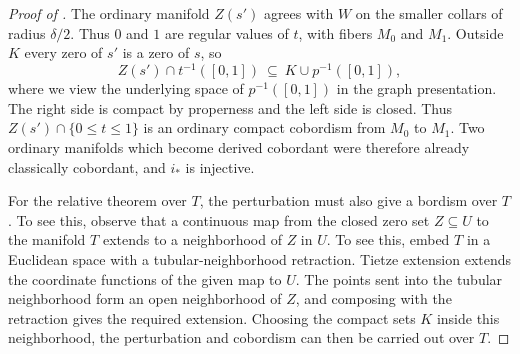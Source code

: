 \begin{proof}[Proof of ]
  The ordinary manifold $Z(s')$ agrees with $W$ on the smaller collars of
  radius $\delta/2$. Thus $0$ and $1$ are regular values of $t$, with fibers
  $M_0$ and $M_1$. Outside $K$ every zero of $s'$ is a zero of $s$, so
  \[
    Z(s')\cap t^{-1}([0,1])\ \subseteq\ K\cup p^{-1}([0,1]),
  \]
  where we view the underlying space of $p^{-1}([0,1])$ in the graph
  presentation. The right side is compact by properness and the left side
  is closed. Thus $Z(s')\cap\{0\le t\le1\}$ is an ordinary compact cobordism
  from $M_0$ to $M_1$. Two ordinary manifolds which become derived
  cobordant were therefore already classically cobordant, and $i_*$ is
  injective.

  For the relative theorem over $T$, the perturbation must also give a
  bordism over $T$. To see this, observe that a
  continuous map from the closed zero set $Z\subseteq U$ to the manifold $T$
  extends to a neighborhood of $Z$ in $U$. To see this, embed $T$ in a
  Euclidean space with a tubular-neighborhood retraction. Tietze extension
  extends the coordinate functions of the given map to $U$. The points
  sent into the tubular neighborhood form an open neighborhood of $Z$, and
  composing with the retraction gives the required extension. Choosing the
  compact sets $K$ inside this neighborhood, the perturbation and cobordism
  can then be carried out over $T$.
\end{proof}


